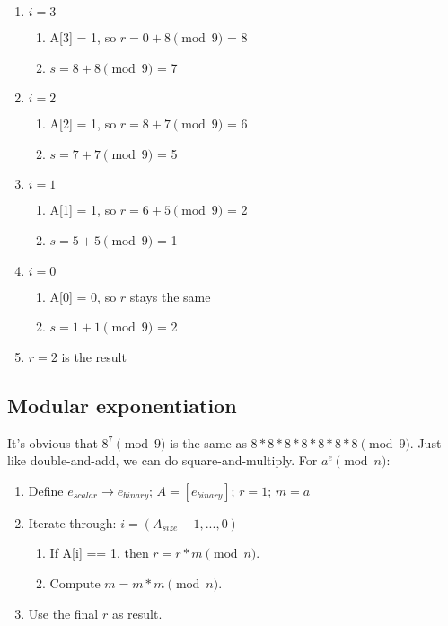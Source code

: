 \begin{enumerate}
	\item $i = 3$
	\begin{enumerate}
		\item A[3] = 1, so $r = 0 + 8 \pmod 9$ = 8
		\item $s = 8 + 8 \pmod 9$ = 7
	\end{enumerate}
	\item $i = 2$
	\begin{enumerate}
		\item A[2] = 1, so $r = 8 + 7 \pmod 9$ = 6
		\item $s = 7 + 7 \pmod 9$ = 5
	\end{enumerate}
	\item $i = 1$
	\begin{enumerate}
		\item A[1] = 1, so $r = 6 + 5 \pmod 9$ = 2
		\item $s = 5 + 5 \pmod 9$ = 1
	\end{enumerate}
	\item $i = 0$
	\begin{enumerate}
		\item A[0] = 0, so $r$ stays the same
		\item $s = 1 + 1 \pmod 9$ = 2
	\end{enumerate}
	\item $r = 2$ is the result
\end{enumerate}


\subsection{Modular exponentiation}

It's obvious that $8^7 \pmod 9$ is the same as $8*8*8*8*8*8*8 \pmod 9$. Just like double-and-add, we can do square-and-multiply. For $a^e \pmod{n}$:

\begin{enumerate}
	\item Define $e_{scalar} \rightarrow e_{binary}$; $A = [e_{binary}]$; $r = 1$; $m = a$
	\item Iterate through: $i = (A_{size} - 1,...,0)$
	\begin{enumerate}
		\item If A[i] == 1, then $r = r * m \pmod n$.
		\item Compute $m = m * m \pmod n$.
	\end{enumerate}
	\item Use the final $r$ as result.
\end{enumerate}


